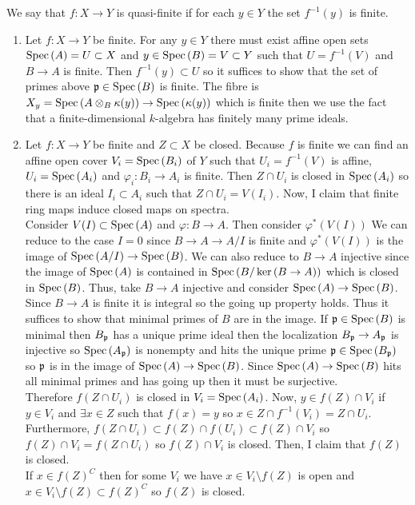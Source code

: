 \documentclass[12pt]{article}
\begin{document}
\begin{definition}
We say that $f : X \to Y$ is quasi-finite if for each $y \in Y$ the set $f^{-1}(y)$ is finite.
\end{definition}

\begin{enumerate}
\item Let $f : X \to Y$ be finite. For any $y \in Y$ there must exist affine open sets $\mathrm{Spec}\left( A \right) = U \subset X$ and $y \in \mathrm{Spec}\left( B \right) = V \subset Y$ such that $U = f^{-1}(V)$ and $B \to A$ is finite. Then $f^{-1}(y) \subset U$ so it suffices to show that the set of primes above $\mathfrak{p} \in \mathrm{Spec}\left( B \right)$ is finite. The fibre is $X_y = \mathrm{Spec}\left( A \otimes_B \kappa(y) \right) \to \mathrm{Spec}\left( \kappa(y) \right)$ which is finite then we use the fact that a finite-dimensional $k$-algebra has finitely many prime ideals. 
\item Let $f : X \to Y$ be finite and $Z \subset X$ be closed. Because $f$ is finite we can find an affine open cover $V_i = \mathrm{Spec}\left( B_i \right)$ of $Y$ such that $U_i = f^{-1}(V)$ is affine, $U_i = \mathrm{Spec}\left( A_i \right)$ and $\varphi_i : B_i \to A_i$ is finite. Then $Z \cap U_i$ is closed in $\mathrm{Spec}\left( A_i \right)$ so there is an ideal $I_i \subset A_i$ such that $Z \cap U_i = V(I_i)$. Now, I claim that finite ring maps induce closed maps on spectra. 
\bigskip\\
Consider $V(I) \subset \mathrm{Spec}\left( A \right)$ and $\varphi : B \to A$. Then consider $\varphi^*(V(I))$
We can reduce to the case $I = 0$ since $B \to A \to A / I$ is finite and $\varphi^*(V(I))$ is the image of $\mathrm{Spec}\left( A / I \right) \to \mathrm{Spec}\left( B \right)$. We can also reduce to $B \to A$ injective since the image of $\mathrm{Spec}\left( A \right)$ is contained in $\mathrm{Spec}\left( B / \ker{(B \to A)} \right)$ which is closed in $\mathrm{Spec}\left( B \right)$. Thus, take $B \to A$ injective and consider $\mathrm{Spec}\left( A \right) \to \mathrm{Spec}\left( B \right)$. Since $B \to A$ is finite it is integral so the going up property holds. Thus it suffices to show that minimal primes of $B$ are in the image. If $\mathfrak{p} \in \mathrm{Spec}\left( B \right)$ is minimal then $B_{\mathfrak{p}}$ has a unique prime ideal then the localization $B_{\mathfrak{p}} \to A_{\mathfrak{p}}$ is injective so $\mathrm{Spec}\left( A_{\mathfrak{p}} \right)$ is nonempty and hits the unique prime $\mathfrak{p} \in \mathrm{Spec}\left( B_{\mathfrak{p}} \right)$ so $\mathfrak{p}$ is in the image of $\mathrm{Spec}\left( A \right) \to \mathrm{Spec}\left( B \right)$. Since $\mathrm{Spec}\left( A \right) \to \mathrm{Spec}\left( B \right)$ hits all minimal primes and has going up then it must be surjective. 
\bigskip\\
Therefore $f(Z \cap U_i)$ is closed in $V_i = \mathrm{Spec}\left( A_i \right)$. Now, $y \in f(Z) \cap V_i$ if $y \in V_i$ and $\exists x \in Z$ such that $f(x) = y$ so $x \in Z \cap f^{-1}(V_i) = Z \cap U_i$. Furthermore, $f(Z \cap U_i) \subset f(Z) \cap f(U_i) \subset f(Z) \cap V_i$ so $f(Z) \cap V_i = f(Z \cap U_i)$ so $f(Z) \cap V_i$ is closed. Then, I claim that $f(Z)$ is closed. 
\bigskip\\
If $x \in f(Z)^C$ then for some $V_i$ we have $x \in V_i \setminus f(Z)$ is open and $x \in V_i \setminus f(Z) \subset f(Z)^C$ so $f(Z)$ is closed. 


\end{enumerate}
\end{document}
